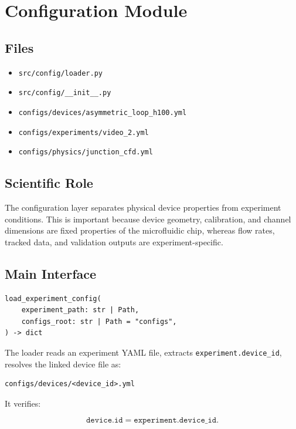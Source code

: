\section{Configuration Module}

\subsection{Files}

\begin{itemize}
  \item \texttt{src/config/loader.py}
  \item \texttt{src/config/\_\_init\_\_.py}
  \item \texttt{configs/devices/asymmetric\_loop\_h100.yml}
  \item \texttt{configs/experiments/video\_2.yml}
  \item \texttt{configs/physics/junction\_cfd.yml}
\end{itemize}

\subsection{Scientific Role}

The configuration layer separates physical device properties from experiment
conditions. This is important because device geometry, calibration, and channel
dimensions are fixed properties of the microfluidic chip, whereas flow rates,
tracked data, and validation outputs are experiment-specific.

\subsection{Main Interface}

\begin{verbatim}
load_experiment_config(
    experiment_path: str | Path,
    configs_root: str | Path = "configs",
) -> dict
\end{verbatim}

The loader reads an experiment YAML file, extracts
\texttt{experiment.device\_id}, resolves the linked device file as:

\begin{verbatim}
configs/devices/<device_id>.yml
\end{verbatim}

It verifies:

\[
\texttt{device.id} = \texttt{experiment.device\_id}.
\]

